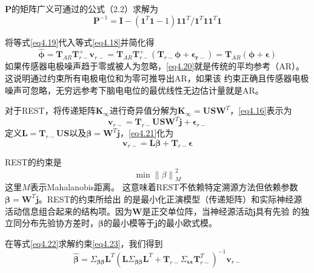 $\mathbf{P}$的矩阵广义可通过\cite{baksalary_revisitation_2003}的公式（2.2）求解为
\begin{equation}\label{eq4.19}
\mathbf{P}^{-1}=\mathbf{I}-(\mathbf{1}^T\mathbf{1}-1)\mathbf{11}^T/{\mathbf{1}^T\mathbf{11}^T\mathbf{1}}
\end{equation}

将等式\eqref{eq4.19}代入等式\eqref{eq4.18}并简化得
\begin{equation}\label{eq4.20}
\hat{\mathbf{\phi}}=\mathbf{T}_{AR}\mathbf{T}_{r-}^+\mathbf{v}_{r-}=\mathbf{T}_{AR}\mathbf{T}_{r-}^+(\mathbf{T}_{r-}\mathbf{\phi}+\mathbf{\epsilon_{r-}})=\mathbf{T}_{AR}(\mathbf{\phi}+\mathbf{\epsilon})
\end{equation}
如果传感器电极噪声趋于零或被人为忽略，\eqref{eq4.20}就是传统的平均参考（AR）。 这说明通过约束所有电极电位和为零可推导出AR，如果该
约束正确且传感器电极噪声可忽略，无穷远参考下脑电电位的最优线性无边估计量就是AR。

对于REST，将传递矩阵$\mathbf{K}_{\infty}$进行奇异值分解为$\mathbf{K}_{\infty}=\mathbf{USW}^T$，\eqref{eq4.16}表示为
\begin{equation}\label{eq4.21}
\mathbf{v}_{r-}=\mathbf{T}_{r-}\mathbf{USW}^T\mathbf{j}+\mathbf{\epsilon}_{r-}
\end{equation}
定义$\mathbf{L}=\mathbf{T}_{r-}\mathbf{US}$以及$\mathbf{\beta}=\mathbf{W}^T\mathbf{j}$，\eqref{eq4.21}化为
\begin{equation}\label{eq4.22}
\mathbf{v}_{r-}=\mathbf{L\beta}+\mathbf{T}_{r-}\mathbf{\epsilon}
\end{equation}

REST的约束是
\begin{equation}\label{eq4.23}
\min{\lVert{\beta}\rVert}_M^2
\end{equation}
这里$M$表示Mahalanobis距离。 这意味着REST不依赖特定溯源方法但依赖参数$\mathbf{\beta}=\mathbf{W}^T\mathbf{j}$。REST的约束所给出
的是最小化正演模型（传递矩阵）和实际神经源活动信息组合起来的结构项。因为$\mathbf{W}$是正交单位阵，当神经源活动$\mathbf{j}$具有先验
的独立同分布先验协方差时，$\mathbf{\beta}$的最小模等于$\mathbf{j}$的最小欧式模。

在等式\eqref{eq4.22}求解约束\eqref{eq4.23}，我们得到
\begin{equation}\label{eq4.24}
\hat{\mathbf{\beta}}=\Sigma_{\mathbf{\beta\beta}}\mathbf{L}^T(\mathbf{L}\Sigma_\mathbf{\beta\beta}\mathbf{L}^T+\mathbf{T}_{r-}\Sigma_{\mathbf{\epsilon\epsilon}}\mathbf{T}_{r-}^T)^{-1}\mathbf{v}_{r-}
\end{equation}

